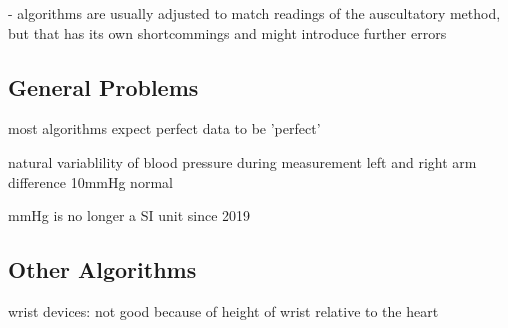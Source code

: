 - algorithms are usually adjusted to match readings of the auscultatory method, but that has its own shortcommings and might introduce further errors

\subsection{General Problems}
most algorithms expect perfect data to be 'perfect'

natural variablility of blood pressure during measurement
left and right arm difference 10mmHg normal


mmHg is no longer a SI unit since 2019

\subsection{Other Algorithms}

wrist devices: not good because of height of wrist relative to the heart
